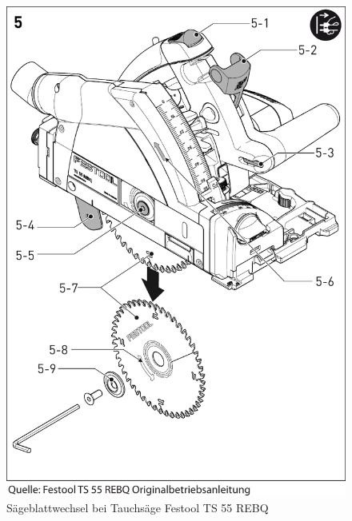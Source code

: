 \documentclass{\basedir/fablab-document}
\begin{document}
\begin{figure}[h]
	\centering
	\includegraphics[width=1\textwidth]{img/festool-blattwechsel.pdf}
	\caption{Sägeblattwechsel bei Tauchsäge Festool TS 55 REBQ}
	\label{fig:blattwechsel}
\end{figure}
\end{document}
